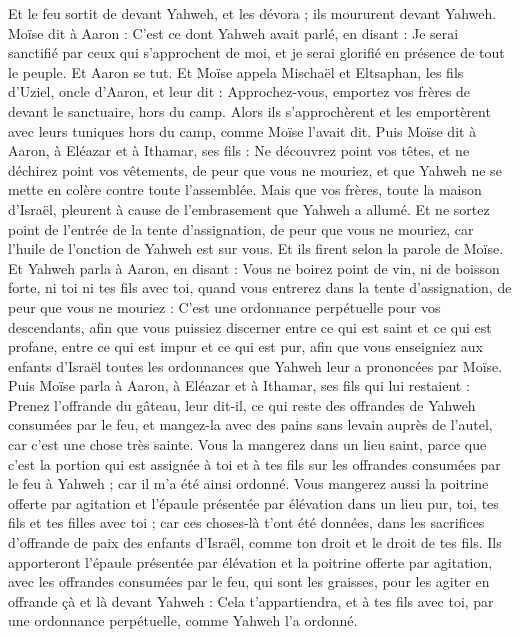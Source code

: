 \begin{multicols}{2}
Et le feu sortit de devant Yahweh, et les dévora ; ils moururent devant Yahweh.
Moïse dit à Aaron : C'est ce dont Yahweh avait parlé, en disant : Je serai sanctifié par ceux qui s'approchent de moi, et je serai glorifié en présence de tout le peuple. Et Aaron se tut.
Et Moïse appela Mischaël et Eltsaphan, les fils d'Uziel, oncle d'Aaron, et leur dit : Approchez-vous, emportez vos frères de devant le sanctuaire, hors du camp.
Alors ils s'approchèrent et les emportèrent avec leurs tuniques hors du camp, comme Moïse l'avait dit.
Puis Moïse dit à Aaron, à Eléazar et à Ithamar, ses fils : Ne découvrez point vos têtes, et ne déchirez point vos vêtements, de peur que vous ne mouriez, et que Yahweh ne se mette en colère contre toute l'assemblée. Mais que vos frères, toute la maison d'Israël, pleurent à cause de l'embrasement que Yahweh a allumé.
Et ne sortez point de l'entrée de la tente d'assignation, de peur que vous ne mouriez, car l'huile de l'onction de Yahweh est sur vous. Et ils firent selon la parole de Moïse.
Et Yahweh parla à Aaron, en disant :
Vous ne boirez point de vin, ni de boisson forte, ni toi ni tes fils avec toi, quand vous entrerez dans la tente d'assignation, de peur que vous ne mouriez : C'est une ordonnance perpétuelle pour vos descendants,
afin que vous puissiez discerner entre ce qui est saint et ce qui est profane, entre ce qui est impur et ce qui est pur,
afin que vous enseigniez aux enfants d'Israël toutes les ordonnances que Yahweh leur a prononcées par Moïse.
Puis Moïse parla à Aaron, à Eléazar et à Ithamar, ses fils qui lui restaient : Prenez l'offrande du gâteau, leur dit-il, ce qui reste des offrandes de Yahweh consumées par le feu, et mangez-la avec des pains sans levain auprès de l'autel, car c'est une chose très sainte.
Vous la mangerez dans un lieu saint, parce que c'est la portion qui est assignée à toi et à tes fils sur les offrandes consumées par le feu à Yahweh ; car il m'a été ainsi ordonné.
Vous mangerez aussi la poitrine offerte par agitation et l'épaule présentée par élévation dans un lieu pur, toi, tes fils et tes filles avec toi ; car ces choses-là t'ont été données, dans les sacrifices d'offrande de paix des enfants d'Israël, comme ton droit et le droit de tes fils.
Ils apporteront l'épaule présentée par élévation et la poitrine offerte par agitation, avec les offrandes consumées par le feu, qui sont les graisses, pour les agiter en offrande çà et là devant Yahweh : Cela t'appartiendra, et à tes fils avec toi, par une ordonnance perpétuelle, comme Yahweh l'a ordonné.

\end{multicols}
